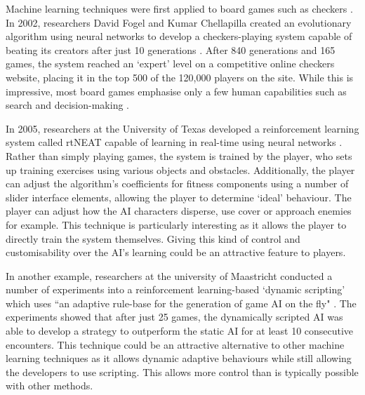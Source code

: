 \documentclass[a4paper,oneside]{report}
\begin{document}
Machine learning techniques were first applied to board games such as checkers \cite{Samuel:1959qo, Samuel:1967ye}. In 2002, researchers David Fogel and Kumar Chellapilla created an evolutionary algorithm using neural networks to develop a checkers-playing system capable of beating its creators after just 10 generations \cite{Fogel:2003fk}. After 840 generations and 165 games, the system reached an `expert' level on a competitive online checkers website, placing it in the top 500 of the 120,000 players on the site. While this is impressive, most board games emphasise only a few human capabilities such as search and decision-making \cite{Laird:2001tw}. 

In 2005, researchers at the University of Texas developed a reinforcement learning system called rtNEAT capable of learning in real-time using neural networks \cite{Stanley:2005ff}. Rather than simply playing games, the system is trained by the player, who sets up training exercises using various objects and obstacles. Additionally, the player can adjust the algorithm's coefficients for fitness components using a number of slider interface elements, allowing the player to determine `ideal' behaviour. The player can adjust how the AI characters disperse, use cover or approach enemies for example. This technique is particularly interesting as it allows the player to directly train the system themselves. Giving this kind of control and customisability over the AI's learning could be an attractive feature to players. 

In another example, researchers at the university of Maastricht conducted a number of experiments into a reinforcement learning-based `dynamic scripting' which uses ``an adaptive rule-base for the generation of game AI on the fly" \cite{Spronck:2005fu}. The experiments showed that after just 25 games, the dynamically scripted AI was able to develop a strategy to outperform the static AI for at least 10 consecutive encounters. This technique could be an attractive alternative to other machine learning techniques as it allows dynamic adaptive behaviours while still allowing the developers to use scripting. This allows more control than is typically possible with other methods.
\end{document}

